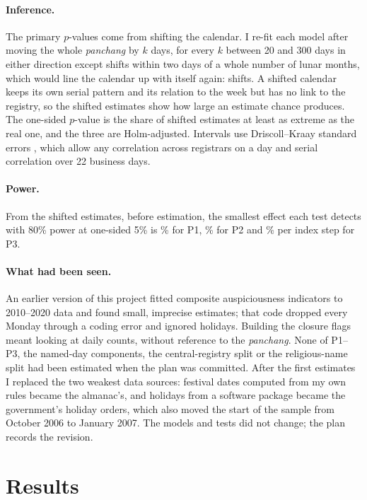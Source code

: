 \documentclass[12pt,letterpaper]{article}
\newcommand{\panchang}{\textit{panchang}}
\begin{document}
\paragraph{Inference.} The primary $p$-values come from shifting the calendar. I re-fit each model after moving the whole \panchang{} by $k$ days, for every $k$ between 20 and 300 days in either direction except shifts within two days of a whole number of lunar months, which would line the calendar up with itself again: \NShifts{} shifts. A shifted calendar keeps its own serial pattern and its relation to the week but has no link to the registry, so the shifted estimates show how large an estimate chance produces. The one-sided $p$-value is the share of shifted estimates at least as extreme as the real one, and the three are Holm-adjusted. Intervals use Driscoll--Kraay standard errors \citep{driscoll1998consistent}, which allow any correlation across registrars on a day and serial correlation over 22 business days.

\paragraph{Power.} From the shifted estimates, before estimation, the smallest effect each test detects with 80\% power at one-sided 5\% is \MdePOne\% for P1, \MdePTwo\% for P2 and \MdePThree\% per index step for P3.

\paragraph{What had been seen.} An earlier version of this project fitted composite auspiciousness indicators to 2010--2020 data and found small, imprecise estimates; that code dropped every Monday through a coding error and ignored holidays. Building the closure flags meant looking at daily counts, without reference to the \panchang. None of P1--P3, the named-day components, the central-registry split or the religious-name split had been estimated when the plan was committed. After the first estimates I replaced the two weakest data sources: festival dates computed from my own rules became the almanac's, and holidays from a software package became the government's holiday orders, which also moved the start of the sample from October 2006 to January 2007. The models and tests did not change; the plan records the revision.

\section{Results}
\end{document}
